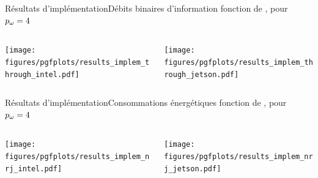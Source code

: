 \documentclass[../main.tex]{subfiles}
\begin{document}
\begin{frame}{Résultats d'implémentation}{Débits binaires d'information fonction de \textcolor{Red}{\pd{}}, pour \textcolor{Blue}{$p_\omega{} = 4$}}
  \begin{columns}
    \begin{column}{.5\linewidth}
      \begin{overlayarea}{\linewidth}{.75\textheight}
        \centering
        \texttt{[image: figures/pgfplots/results\_implem\_through\_intel.pdf]}
      \end{overlayarea}
    \end{column}
    \begin{column}{.5\linewidth}
      \begin{overlayarea}{\linewidth}{.75\textheight}
        \centering
        \texttt{[image: figures/pgfplots/results\_implem\_through\_jetson.pdf]}
      \end{overlayarea}
    \end{column}
  \end{columns}

\end{frame}

\begin{frame}{Résultats d'implémentation}{Consommations énergétiques fonction de \textcolor{Red}{\pd{}}, pour \textcolor{Blue}{$p_\omega{} = 4$}}
  \begin{columns}
    \begin{column}{.5\linewidth}
      \begin{overlayarea}{\linewidth}{.75\textheight}
        \centering
        \texttt{[image: figures/pgfplots/results\_implem\_nrj\_intel.pdf]}
      \end{overlayarea}
    \end{column}
    \begin{column}{.5\linewidth}
      \begin{overlayarea}{\linewidth}{.75\textheight}
        \centering
        \texttt{[image: figures/pgfplots/results\_implem\_nrj\_jetson.pdf]}
      \end{overlayarea}
    \end{column}
  \end{columns}

\end{frame}
\end{document}
